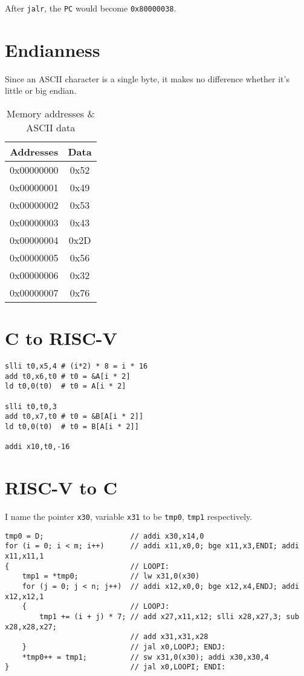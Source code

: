 \documentclass[12pt, a4paper]{article}
\begin{document}
After \texttt{jalr}, the \texttt{PC} would become \texttt{0x80000038}.

\section{Endianness}

Since an ASCII character is a single byte, it makes no difference whether it's little or big endian.

\begin{table}[H]
\caption{Memory addresses \& ASCII data}
\centering
\ttfamily
\begin{tabular}{cc}
\hline
Addresses & Data \\
\hline\hline
0x00000000 & 0x52 \\
0x00000001 & 0x49 \\
0x00000002 & 0x53 \\
0x00000003 & 0x43 \\
0x00000004 & 0x2D \\
0x00000005 & 0x56 \\
0x00000006 & 0x32 \\
0x00000007 & 0x76 \\
\hline
\end{tabular}
\label{endian}
\end{table}

\section{C to RISC-V}

\begin{verbatim}
slli t0,x5,4 # (i*2) * 8 = i * 16
add t0,x6,t0 # t0 = &A[i * 2]
ld t0,0(t0)  # t0 = A[i * 2]

slli t0,t0,3
add t0,x7,t0 # t0 = &B[A[i * 2]]
ld t0,0(t0)  # t0 = B[A[i * 2]]

addi x10,t0,-16
\end{verbatim}

\section{RISC-V to C}

I name the pointer \texttt{x30}, variable \texttt{x31} to be \texttt{tmp0}, \texttt{tmp1} respectively.

\begin{verbatim}
tmp0 = D;                    // addi x30,x14,0
for (i = 0; i < m; i++)      // addi x11,x0,0; bge x11,x3,ENDI; addi x11,x11,1
{                            // LOOPI:
    tmp1 = *tmp0;            // lw x31,0(x30)
    for (j = 0; j < n; j++)  // addi x12,x0,0; bge x12,x4,ENDJ; addi x12,x12,1
    {                        // LOOPJ:
        tmp1 += (i + j) * 7; // add x27,x11,x12; slli x28,x27,3; sub x28,x28,x27;
                             // add x31,x31,x28
    }                        // jal x0,LOOPJ; ENDJ:
    *tmp0++ = tmp1;          // sw x31,0(x30); addi x30,x30,4
}                            // jal x0,LOOPI; ENDI:
\end{verbatim}
\end{document}
